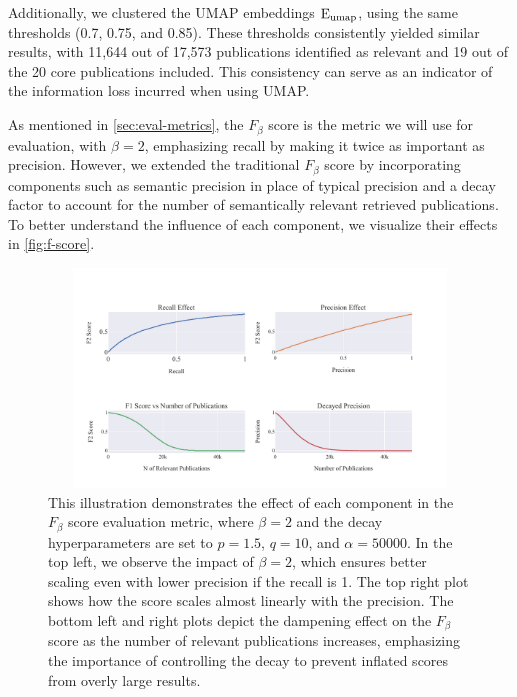 Additionally, we clustered the UMAP embeddings $\mathop{}\!\mathrm{E_{umap}}$, using the same thresholds (0.7, 0.75, and 0.85). These thresholds consistently yielded similar results, with 11,644 out of 17,573 publications identified as relevant and 19 out of the 20 core publications included. This consistency can serve as an indicator of the information loss incurred when using UMAP.

As mentioned in \autoref{sec:eval-metrics}, the $F_{\beta}$ score is the metric we will use for evaluation, with $\beta=2$, emphasizing recall by making it twice as important as precision. However, we extended the traditional $F_{\beta}$ score by incorporating components such as semantic precision in place of typical precision and a decay factor to account for the number of semantically relevant retrieved publications. To better understand the influence of each component, we visualize their effects in \autoref{fig:f-score}.

\begin{figure}[!t]
	\hspace*{-1cm}
	\includegraphics[width=450px, height=220px]{pics/f_score.pdf}
	\caption[$F_{\beta}$ Components Analysis]{This illustration demonstrates the effect of each component in the $F_{\beta}$ score evaluation metric, where $\beta=2$ and the decay hyperparameters are set to $p=1.5$, $q=10$, and $\alpha=50000$. In the top left, we observe the impact of $\beta=2$, which ensures better scaling even with lower precision if the recall is 1. The top right plot shows how the score scales almost linearly with the precision. The bottom left and right plots depict the dampening effect on the $F_{\beta}$ score as the number of relevant publications increases, emphasizing the importance of controlling the decay to prevent inflated scores from overly large results.}\label{fig:f-score}
\end{figure}


